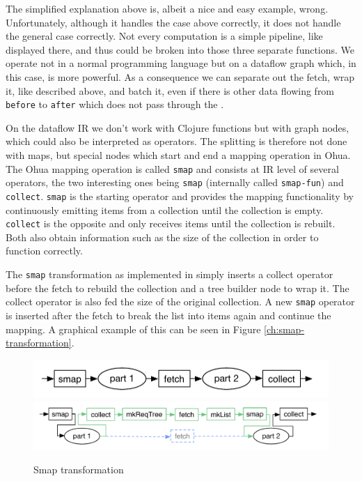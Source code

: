 The simplified explanation above is, albeit a nice and easy example, wrong.
Unfortunately, although it handles the case above correctly, it does not handle the general case correctly.
Not every computation is a simple pipeline, like displayed there, and thus could be broken into those three separate functions.
We operate not in a normal programming language but on a dataflow graph which, in this case, is more powerful.
As a consequence we can separate out the fetch, wrap it, like described above, and batch it, even if there is other data flowing from \texttt{before} to \texttt{after} which does not pass through the \fetch{}.

On the dataflow IR we don't work with Clojure functions but with graph nodes, which could also be interpreted as operators.
The splitting is therefore not done with maps, but special nodes which start and end a mapping operation in Ohua.
The Ohua mapping operation is called \texttt{smap} and consists at IR level of several operators, the two interesting ones being \texttt{smap} (internally called \texttt{smap-fun}) and \texttt{collect}.
\texttt{smap} is the starting operator and provides the mapping functionality by continuously emitting items from a collection until the collection is empty.
\texttt{collect} is the opposite and only receives items until the collection is rebuilt.
Both also obtain information such as the size of the collection in order to function correctly.

The \texttt{smap} transformation as implemented in \yauhau{} simply inserts a collect operator before the fetch to rebuild the collection and a tree builder node to wrap it.
The collect operator is also fed the size of the original collection.
A new \texttt{smap} operator is inserted after the fetch to break the list into items again and continue the mapping.
A graphical example of this can be seen in Figure \ref{ch:smap-transformation}.

\begin{figure}[h]
	\includegraphics[width=\textwidth]{Figures/smap-rewrite-original}
	\includegraphics[width=\textwidth]{Figures/smap-rewrite}
	\label{fig:smap-transformation}
	\caption{Smap transformation}
\end{figure}

